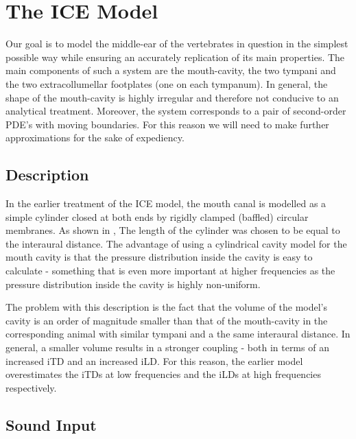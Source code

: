 \chapter{The ICE Model}

Our goal is to model the
middle-ear of the vertebrates in question in the simplest possible way while ensuring an accurately replication of its main properties. 
The main components of such a 
system are the mouth-cavity, the two tympani and the two extracollumellar
footplates (one on each tympanum). In general, the shape of the mouth-cavity is highly irregular and therefore
not conducive to an analytical treatment. Moreover, the system corresponds to a pair of second-order PDE's with
moving boundaries. For this reason we will need to make further approximations for the sake of expediency.

\section{Description}
In the earlier treatment of the ICE model, the mouth canal is modelled as a simple cylinder closed at 
both ends by rigidly clamped (baffled) circular membranes. As shown in \cite{vossenthesis}, The length of the cylinder was chosen to be equal
to the interaural distance. The advantage of using a cylindrical cavity model for the mouth cavity is that the pressure
distribution inside the cavity is easy to calculate - something that is even more important at higher frequencies
as the pressure distribution inside the cavity is highly non-uniform. 

The problem with this description is the fact that the volume of the model's cavity 
is an order of magnitude smaller than that of the mouth-cavity in the corresponding animal with similar
tympani and a the same interaural distance. In general, a smaller volume results in a stronger coupling - both in terms of an increased iTD and an increased
iLD. For this reason, the earlier model overestimates the iTDs at low frequencies and the iLDs at
high frequencies respectively.

\section{Sound Input}

